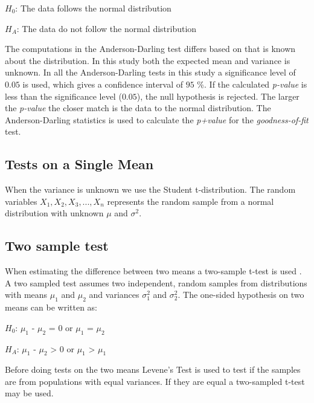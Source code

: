 \centerline{$H_{0}$: The data follows the normal distribution} 
\centerline{$H_{A}$: The data do not follow the normal distribution}

The computations in the Anderson-Darling test differs based on that is known about the distribution. In this study both the expected mean and variance is unknown. In all the Anderson-Darling tests in this study a significance level of $0.05$ is used, which gives a confidence interval of $95$ \%. If the calculated \textit{p-value} is less than the significance level ($0.05$), the null hypothesis is rejected. The larger the \textit{p-value} the closer match is the data to the normal distribution. The Anderson-Darling statistics is used to calculate the \textit{p+value} for the \textit{goodness-of-fit} test. 

\subsection{Tests on a Single Mean}
When the variance is unknown we use the Student t-distribution. The random variables $X_{1}, X_{2}, X_{3}, ..., X_{n}$ represents the random sample from a normal distribution with unknown $\mu$ and $\sigma{}^{2}$. 


\subsection{Two sample test}
When estimating the difference between two means a two-sample t-test is used \citep{Walpole2012}. A two sampled test assumes two independent, random samples from distributions with means $\mu_{1}$ and $\mu_{2}$ and variances $\sigma_{1}^{2}$ and $\sigma_{2}^{2}$. %
The one-sided hypothesis on two means can be written as:\newline

\centerline{$H_{0}$: $\mu_{1}$ - $\mu_{2}$ = 0 or $\mu_{1}$ = $\mu_{2}$} 
\centerline{$H_{A}$: $\mu_{1}$ - $\mu_{2}$ > 0 or $\mu_{1}$ > $\mu_{1}$}
 
Before doing tests on the two means Levene's Test is used to test if the samples are from populations with equal variances. If they are equal a two-sampled t-test may be used. %


